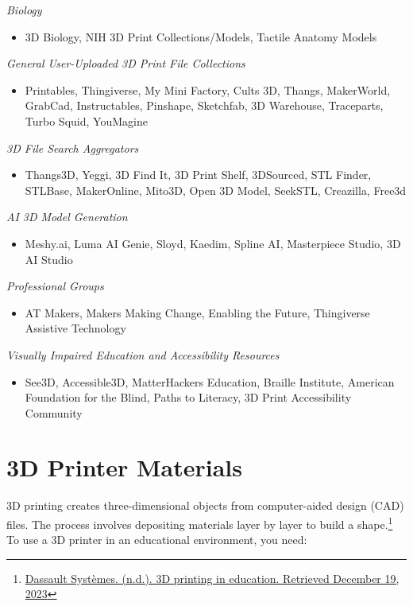 \emph{Biology}
\begin{itemize}
    \item 3D Biology, NIH 3D Print Collections/Models, Tactile Anatomy Models
\end{itemize}

\emph{General User-Uploaded 3D Print File Collections}
\begin{itemize}
    \item Printables, Thingiverse, My Mini Factory, Cults 3D, Thangs, MakerWorld, GrabCad, Instructables, Pinshape, Sketchfab, 3D Warehouse, Traceparts, Turbo Squid, YouMagine
\end{itemize}

\emph{3D File Search Aggregators}
\begin{itemize}
    \item Thangs3D, Yeggi, 3D Find It, 3D Print Shelf, 3DSourced, STL Finder, STLBase, MakerOnline, Mito3D, Open 3D Model, SeekSTL, Creazilla, Free3d
\end{itemize}

\emph{AI 3D Model Generation}
\begin{itemize}
    \item Meshy.ai, Luma AI Genie, Sloyd, Kaedim, Spline AI, Masterpiece Studio, 3D AI Studio
\end{itemize}

\emph{Professional Groups}
\begin{itemize}
    \item AT Makers, Makers Making Change, Enabling the Future, Thingiverse Assistive Technology
\end{itemize}

\emph{Visually Impaired Education and Accessibility Resources}
\begin{itemize}
    \item See3D, Accessible3D, MatterHackers Education, Braille Institute, American Foundation for the Blind, Paths to Literacy, 3D Print Accessibility Community
\end{itemize}

\section{3D Printer Materials}\label{d-printer-materials}
3D printing creates three-dimensional objects from computer-aided design (CAD) files. The process involves depositing materials layer by layer to build a shape.\footnote{\href{http://www.3ds.com/make/solutions/industries/3d-printing-education}{Dassault Systèmes. (n.d.). 3D printing in education. Retrieved December 19, 2023}} To use a 3D printer in an educational environment, you need:

